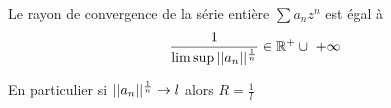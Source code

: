 %
%
%
\begin{thm}
  Le rayon de convergence de la série entière $\sum a_n z^n$ est égal à
\[
\frac{1}{\limsup ||a_n||^{1 \over n}} \in \mathbb{R}^+ \cup\ + \infty~\
\]
\end{thm}

\begin{rem}
  En particulier si $||a_n||^{1 \over n}\rightarrow l$ alors $R=\frac{1}{l}$
\end{rem}
%
%
